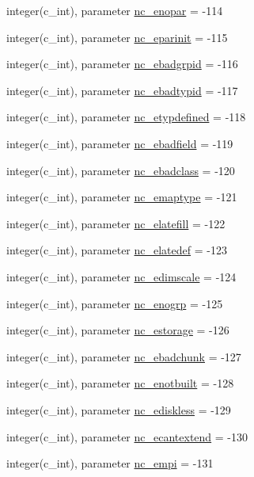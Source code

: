 \begin{DoxyCompactItemize}
\item 
integer(c\+\_\+int), parameter \hyperlink{namespacenetcdf__nc__data_aef244b9b47636b8dbe5895eca0b18136}{nc\+\_\+enopar} = -\/114
\item 
integer(c\+\_\+int), parameter \hyperlink{namespacenetcdf__nc__data_aafdc94b9d4b9e1d38989f30e1854a9f0}{nc\+\_\+eparinit} = -\/115
\item 
integer(c\+\_\+int), parameter \hyperlink{namespacenetcdf__nc__data_a016aacc26702e1653ed70acc2fe43f80}{nc\+\_\+ebadgrpid} = -\/116
\item 
integer(c\+\_\+int), parameter \hyperlink{namespacenetcdf__nc__data_aacaa397d41962ebba916f042f0f53759}{nc\+\_\+ebadtypid} = -\/117
\item 
integer(c\+\_\+int), parameter \hyperlink{namespacenetcdf__nc__data_a0b666565d2bf5ba2a238201461c372bb}{nc\+\_\+etypdefined} = -\/118
\item 
integer(c\+\_\+int), parameter \hyperlink{namespacenetcdf__nc__data_a0cbc5e39141140f6ae945c7f1051cadb}{nc\+\_\+ebadfield} = -\/119
\item 
integer(c\+\_\+int), parameter \hyperlink{namespacenetcdf__nc__data_a49f4c888b7013c4b35a2cb7932aa5a2a}{nc\+\_\+ebadclass} = -\/120
\item 
integer(c\+\_\+int), parameter \hyperlink{namespacenetcdf__nc__data_ae126761580f911f20a8576a543ed1745}{nc\+\_\+emaptype} = -\/121
\item 
integer(c\+\_\+int), parameter \hyperlink{namespacenetcdf__nc__data_a35546e0bc279190e09ff3c7fd38ba0e0}{nc\+\_\+elatefill} = -\/122
\item 
integer(c\+\_\+int), parameter \hyperlink{namespacenetcdf__nc__data_afceb430776794c9fa31c911aacfff432}{nc\+\_\+elatedef} = -\/123
\item 
integer(c\+\_\+int), parameter \hyperlink{namespacenetcdf__nc__data_acbc771537293b7ab5f9c447c67228eb4}{nc\+\_\+edimscale} = -\/124
\item 
integer(c\+\_\+int), parameter \hyperlink{namespacenetcdf__nc__data_a9bc185173e0b07302a0998fe5fb7950e}{nc\+\_\+enogrp} = -\/125
\item 
integer(c\+\_\+int), parameter \hyperlink{namespacenetcdf__nc__data_aa9f3cb09d10ef954bff75ddcd1cbba3a}{nc\+\_\+estorage} = -\/126
\item 
integer(c\+\_\+int), parameter \hyperlink{namespacenetcdf__nc__data_aee928b81bad0c1efcd654ac94cc1629c}{nc\+\_\+ebadchunk} = -\/127
\item 
integer(c\+\_\+int), parameter \hyperlink{namespacenetcdf__nc__data_aab71e3cdefb6b14499cc3d7144a1ea93}{nc\+\_\+enotbuilt} = -\/128
\item 
integer(c\+\_\+int), parameter \hyperlink{namespacenetcdf__nc__data_a063068501e779d1d67f86a807a0bce79}{nc\+\_\+ediskless} = -\/129
\item 
integer(c\+\_\+int), parameter \hyperlink{namespacenetcdf__nc__data_a8f0dc0ee87dc5e387b3552024b75e537}{nc\+\_\+ecantextend} = -\/130
\item 
integer(c\+\_\+int), parameter \hyperlink{namespacenetcdf__nc__data_af84e7f0ade88091d392d82f3982fc2a9}{nc\+\_\+empi} = -\/131
\end{DoxyCompactItemize}


